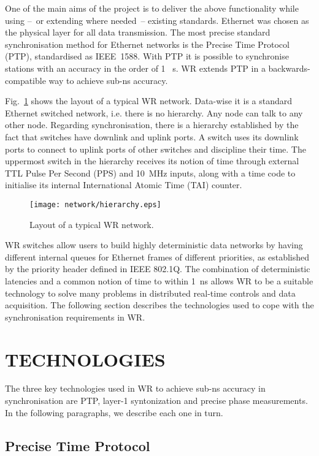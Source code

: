 \documentclass{../JAC2003}
\begin{document}
One of the main aims of the project is to deliver the above
functionality while using --~or extending where needed~-- existing
standards. Ethernet was chosen as the physical layer for all data
transmission. The most precise standard synchronisation method for
Ethernet networks is the Precise Time Protocol (PTP), standardised as
IEEE~1588. With PTP it is possible to synchronise stations with an
accuracy in the order of 1~ \textmu s. WR extends PTP in a
backwards-compatible way to achieve sub-ns accuracy.

Fig.~\ref{hierarchy-fig} shows the layout of a typical WR
network. Data-wise it is a standard Ethernet switched network,
i.e. there is no hierarchy. Any node can talk to any other
node. Regarding synchronisation, there is a hierarchy established by
the fact that switches have downlink and uplink ports. A switch uses
its downlink ports to connect to uplink ports of other switches and
discipline their time. The uppermost switch in the hierarchy receives
its notion of time through external TTL Pulse Per Second (PPS) and
10~MHz inputs, along with a time code to initialise its internal
International Atomic Time (TAI) counter.  

\begin{figure}[htb]
   \centering
   \texttt{[image: network/hierarchy.eps]}
   \caption{Layout of a typical WR network.}
   \label{hierarchy-fig}
\end{figure}

WR switches allow users to build highly deterministic data networks by
having different internal queues for Ethernet frames of different
priorities, as established by the priority header defined in IEEE
802.1Q. The combination of deterministic latencies and a common notion
of time to within 1~ns allows WR to be a suitable technology to solve
many problems in distributed real-time controls and data
acquisition. The following section describes the technologies used to
cope with the synchronisation requirements in WR.

\section{TECHNOLOGIES}

The three key technologies used in WR to achieve sub-ns accuracy in
synchronisation are PTP, layer-1 syntonization and precise phase
measurements. In the following paragraphs, we describe each one in
turn.

\subsection{Precise Time Protocol}
\end{document}
